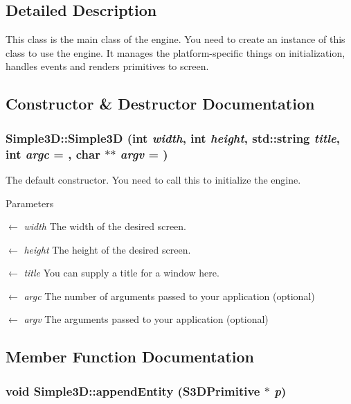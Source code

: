\subsection{Detailed Description}
This class is the main class of the engine. You need to create an instance of this class to use the engine. It manages the platform-\/specific things on initialization, handles events and renders primitives to screen. 

\subsection{Constructor \& Destructor Documentation}
\hypertarget{class_simple3_d_a7644ace43261dd71e7f3cb9c9659025d}{
\subsubsection[{Simple3D}]{\setlength{\rightskip}{0pt plus 5cm}Simple3D::Simple3D (int {\em width}, \/  int {\em height}, \/  std::string {\em title}, \/  int {\em argc} = {}, \/  char $\ast$$\ast$ {\em argv} = {})}}
\label{class_simple3_d_a7644ace43261dd71e7f3cb9c9659025d}


The default constructor. You need to call this to initialize the engine. 


\begin{DoxyParams}{Parameters}
\item[\mbox{$\leftarrow$} {\em width}]The width of the desired screen. \item[\mbox{$\leftarrow$} {\em height}]The height of the desired screen. \item[\mbox{$\leftarrow$} {\em title}]You can supply a title for a window here. \item[\mbox{$\leftarrow$} {\em argc}]The number of arguments passed to your application (optional) \item[\mbox{$\leftarrow$} {\em argv}]The arguments passed to your application (optional) \end{DoxyParams}


\subsection{Member Function Documentation}
\hypertarget{class_simple3_d_abe4d7beed767d1d24154738fad7ac1a7}{
\subsubsection[{appendEntity}]{\setlength{\rightskip}{0pt plus 5cm}void Simple3D::appendEntity ({\bf S3DPrimitive} $\ast$ {\em p})}}
\label{class_simple3_d_abe4d7beed767d1d24154738fad7ac1a7}


